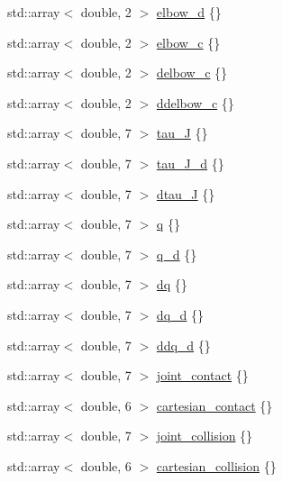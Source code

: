 \begin{DoxyCompactItemize}
\item 
std\+::array$<$ double, 2 $>$ \hyperlink{structfranka_1_1RobotState_a295dada05d8588fc3c19a74fd427dcc0}{elbow\+\_\+d} \{\}
\item 
std\+::array$<$ double, 2 $>$ \hyperlink{structfranka_1_1RobotState_a16cfc844894e8b5b1ad829be529962f0}{elbow\+\_\+c} \{\}
\item 
std\+::array$<$ double, 2 $>$ \hyperlink{structfranka_1_1RobotState_a57c2c145e9f79010adf23085b8a9c5ad}{delbow\+\_\+c} \{\}
\item 
std\+::array$<$ double, 2 $>$ \hyperlink{structfranka_1_1RobotState_a1e5b6caf84249b1129491dbbcb1fc2e6}{ddelbow\+\_\+c} \{\}
\item 
std\+::array$<$ double, 7 $>$ \hyperlink{structfranka_1_1RobotState_ad90e2518d661da0d8fa4c864bae210e5}{tau\+\_\+J} \{\}
\item 
std\+::array$<$ double, 7 $>$ \hyperlink{structfranka_1_1RobotState_a7086a89a2705810f93a3a95d43df2d9d}{tau\+\_\+\+J\+\_\+d} \{\}
\item 
std\+::array$<$ double, 7 $>$ \hyperlink{structfranka_1_1RobotState_ae6b0d4ee0d7b36240a2165e6ded6f4b9}{dtau\+\_\+J} \{\}
\item 
std\+::array$<$ double, 7 $>$ \hyperlink{structfranka_1_1RobotState_ade3335d1ac2f6c44741a916d565f7091}{q} \{\}
\item 
std\+::array$<$ double, 7 $>$ \hyperlink{structfranka_1_1RobotState_a706045af1b176049e9e56df755325bd2}{q\+\_\+d} \{\}
\item 
std\+::array$<$ double, 7 $>$ \hyperlink{structfranka_1_1RobotState_af372a0081d72bc7b4fe873f99c7b2d8c}{dq} \{\}
\item 
std\+::array$<$ double, 7 $>$ \hyperlink{structfranka_1_1RobotState_aed294a088be27b927be9575a18bec949}{dq\+\_\+d} \{\}
\item 
std\+::array$<$ double, 7 $>$ \hyperlink{structfranka_1_1RobotState_a6251e748cf72f4b86bcfdcb97d77ace2}{ddq\+\_\+d} \{\}
\item 
std\+::array$<$ double, 7 $>$ \hyperlink{structfranka_1_1RobotState_a7243c652a8efe58c343a0d1252302fa4}{joint\+\_\+contact} \{\}
\item 
std\+::array$<$ double, 6 $>$ \hyperlink{structfranka_1_1RobotState_a7fc1f0358d2104d39d301d70544fa6c1}{cartesian\+\_\+contact} \{\}
\item 
std\+::array$<$ double, 7 $>$ \hyperlink{structfranka_1_1RobotState_a38757bafd4dd8e138410de1dca0c36f8}{joint\+\_\+collision} \{\}
\item 
std\+::array$<$ double, 6 $>$ \hyperlink{structfranka_1_1RobotState_a52c20478f4c1e162df38582ea9bda044}{cartesian\+\_\+collision} \{\}

\end{DoxyCompactItemize}
